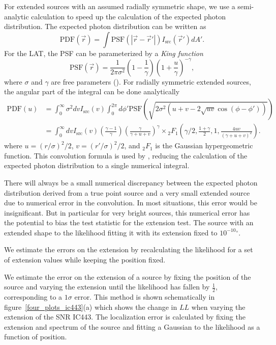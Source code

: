 \documentclass[12pt,preprint]{aastex}
\newcommand{\loglikelihood}{\ensuremath{LL}\xspace}
\renewcommand{\deg}{\ensuremath{^\circ}\xspace}
\newcommand{\pointlike}{\text{\em pointlike}\xspace}
\begin{document}
For extended sources with an assumed radially symmetric shape,
we use a semi-analytic calculation to speed up the calculation of
the expected photon distribution. The expected photon 
distribution can be written as
\begin{equation}
  \text{PDF}(\vec r) = \int  \text{PSF}(|\vec r - \vec r'|)I_\text{src}(\vec r') d A'.
\end{equation}
For the LAT, the PSF can be parameterized by a {\em King function}
\begin{equation}
  \text{PSF}(\vec r) = 
  \frac{1}{2\pi\sigma^2}
  \left(1-\frac{1}{\gamma}\right)
  \left(1+\frac{u}{\gamma}\right)^{-\gamma},
\end{equation}
where $\sigma$ and $\gamma$ are free parameters
(\cite{matthew_kerr_thesis}).  For radially symmetric extended sources,
the angular part of the integral can be done analytically
\begin{align}
  \text{PDF}(u) & = \int_0^\infty \sigma^2 dv 
  I_\text{src}(v) 
  \int_0^{2\pi} d\phi' 
  \text{PSF}(\sqrt{2\sigma^2(u+v-2\sqrt{uv}\cos(\phi-\phi'))})
  \\
  & = \int_0^\infty dv
  I_\text{src}(v) 
  \left(\frac{\gamma-1}{\gamma}\right)
  \left( \frac{\gamma}{\gamma + u + v}\right)^\gamma 
  \times {}_2F_1 \left(\gamma/2,\frac{1+\gamma}{2},1,\frac{4uv}{(\gamma+u+v)^2}\right).
\end{align}
where $u=(r/\sigma)^2/2$, $v=(r'/\sigma)^2/2$, and ${}_2F_1$ is the
Gaussian hypergeometric function.  This convolution formula is used by
\pointlike, reducing the calculation of the expected photon distribution
to a single numerical integral.

There will always be a small numerical discrepancy between the expected
photon distribution derived from a true point source and a very small
extended source due to numerical error in the convolution.  In most
situations, this error would be insignificant.  But in particular for
very bright sources, this numerical error has the potential to bias the
test statistic for the extension test. The source with an extended shape
to the likelihood fitting it with its extension fixed to ${10^{-10}}\deg$.

We estimate the errors on the extension
by recalculating the likelihood for a set of extension values
while keeping the position fixed.

We estimate the error on the extension of a source by fixing the position
of the source and varying the extension until the likelihood has fallen
by $\tfrac{1}{2}$, corresponding to a $1\sigma$ error.  This method is
shown schematically in figure~\ref{four_plots_ic443}(a) which shows the
change in \loglikelihood when varying the extension of the SNR IC443.
The localization error is calculated by fixing the extension and spectrum
of the source and fitting a Gaussian to the likelihood as a function
of position.
\end{document}
